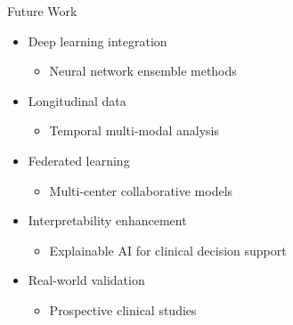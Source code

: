 \documentclass{beamer}
\begin{document}


\begin{frame}{Future Work}
\begin{itemize}
\item \alert{Deep learning integration}
  \begin{itemize}
  \item Neural network ensemble methods
  \end{itemize}
\item \alert{Longitudinal data}
  \begin{itemize}
  \item Temporal multi-modal analysis
  \end{itemize}
\item \alert{Federated learning}
  \begin{itemize}
  \item Multi-center collaborative models
  \end{itemize}
\item \alert{Interpretability enhancement}
  \begin{itemize}
  \item Explainable AI for clinical decision support
  \end{itemize}
\item \alert{Real-world validation}
  \begin{itemize}
  \item Prospective clinical studies
  \end{itemize}
\end{itemize}
\end{frame}
\end{document}
